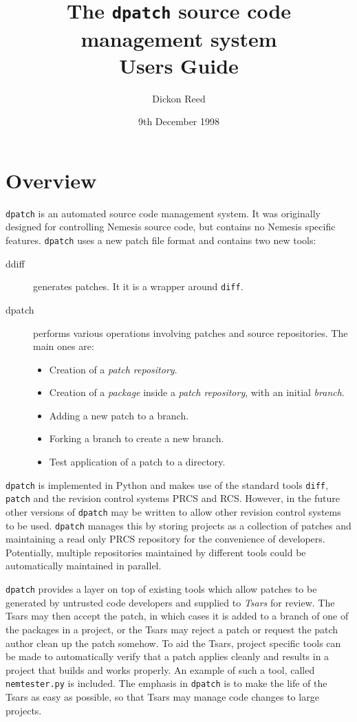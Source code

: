 \documentclass{article}
\title{The \texttt{dpatch} source code management system \\ Users Guide}
\author{Dickon Reed}
\date{9th December 1998}
\begin{document}
\maketitle
\tableofcontents
\section{Overview}



\texttt{dpatch} is an automated source code management system. It was
originally designed for controlling Nemesis source code, but contains
no Nemesis specific features. \texttt{dpatch} uses a new patch file
format and contains two new tools:

\begin{description}
\item[ddiff] generates patches. It it is a wrapper around \texttt{diff}.

\item[dpatch] performs various operations involving patches and source
repositories. The main ones are:
\begin{itemize}
\item Creation of a \emph{patch repository}.
\item Creation of a \emph{package} inside a \emph{patch repository},
with an initial \emph{branch}.
\item Adding a new patch to a branch.
\item Forking a branch to create a new branch.
\item Test application of a patch to a directory.
\end{itemize}
\end{description}

\texttt{dpatch} is implemented in Python and makes use of the standard
tools \texttt{diff}, \texttt{patch} and the revision control systems PRCS and
RCS. However, in the future other versions of \texttt{dpatch} may be
written to allow other revision control systems to be
used. \texttt{dpatch} manages this by storing projects as a collection
of patches and maintaining a read only PRCS repository for the
convenience of developers. Potentially, multiple repositories
maintained by different tools could be automatically maintained in parallel.

\texttt{dpatch} provides a layer on top of existing tools which allow
patches to be generated by untrusted code developers and supplied to
\emph{Tsars} for review. The Tsars may then accept the patch, in which
cases it is added to a branch of one of the packages in a project, or
the Tsars may reject a patch or request the patch author clean up the
patch somehow. To aid the Tsars, project specific tools can be made
to automatically verify that a patch applies cleanly and results in a
project that builds and works properly. An example of such a tool,
called \texttt{nemtester.py} is included. The emphasis in
\texttt{dpatch} is to make the life of the Tsars as easy as possible,
so that Tsars may manage code changes to large projects.
\end{document}
